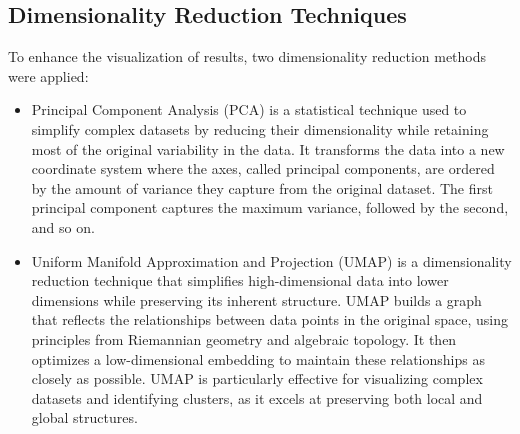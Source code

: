 \subsection{Dimensionality Reduction Techniques} \label{sec:methodology:reduction}
To enhance the visualization of results, two dimensionality reduction methods were applied: 
\begin{itemize}
    \item Principal Component Analysis (PCA) is a statistical technique used to simplify complex datasets by reducing
    their dimensionality while retaining most of the original variability in the data. It transforms the data into a new coordinate
     system where the axes, called principal components, are ordered by the amount of variance they capture from the original dataset. 
     The first principal component captures the maximum variance, followed by the second, and so on.
     \item Uniform Manifold Approximation and Projection (UMAP) is a dimensionality reduction technique 
     that simplifies high-dimensional data into lower dimensions while preserving its inherent structure. UMAP builds a graph 
     that reflects the relationships between data points in the original space, using principles from Riemannian geometry and 
     algebraic topology. It then optimizes a low-dimensional embedding to maintain these relationships as closely as possible. 
     UMAP is particularly effective for visualizing complex datasets and identifying clusters, as it excels at preserving both 
     local and global structures.
\end{itemize}
